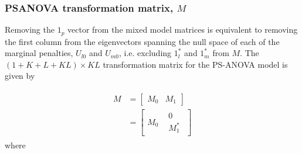 \documentclass[12pt]{article}
\theoremstyle{definition}
\begin{document}
\subsubsection{PSANOVA transformation matrix, $M$}

Removing the $1_p$ vector from the mixed model matrices is equivalent to removing the first column from the eigenvectors spanning the null space of each of the marginal penalties, $U_{l0}$ and $U_{m0}$, i.e. excluding $1_l^*$ and  $1_m^*$ from $M$. The $\left( 1 + K + L + KL \right) \times KL$ transformation matrix for the PS-ANOVA model is given by 

\begin{align}
\begin{split}
M &= \left[ \begin{array}{c|c}  M_0 & M_1  \end{array} \right] \\
&= \left[ \begin{array}{c|c}  M_0 & \begin{array}{c} 0 \\ M_1^* \end{array}  \end{array} \right] 
\end{split}
\end{align}
\noindent
where
\end{document}

